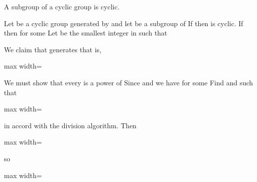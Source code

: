 \documentclass[11pt,oneside]{article}
\begin{document}
\BookNarrativetrue

\begin{BookBody}

 A subgroup of a cyclic group is cyclic.

 Let  be a cyclic group generated by  and let  be a subgroup of  If  then  is cyclic. If  then  for some  Let  be the smallest integer in  such that 

We claim that  generates  that is,

\begin{center}\begin{adjustbox}{max width=\linewidth}\end{adjustbox}\end{center}

\noindent We must show that every  is a power of  Since  and  we have  for some  Find  and  such that

\begin{center}\begin{adjustbox}{max width=\linewidth}\end{adjustbox}\end{center}

\noindent in accord with the division algorithm. Then

\begin{center}\begin{adjustbox}{max width=\linewidth}\end{adjustbox}\end{center}

\noindent so

\begin{center}\begin{adjustbox}{max width=\linewidth}\end{adjustbox}\end{center}


\end{BookBody}
\end{document}
